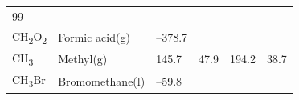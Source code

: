 \documentclass[
  9pt,
]{extbook}
\theoremstyle{definition}
\theoremstyle{definition}
\theoremstyle{definition}
\theoremstyle{remark}
\begin{document}
\begin{longtable}[]{@{}llllll@{}}
\begin{minipage}[t]{0.14\columnwidth}
99\strut
\end{minipage}\tabularnewline
\begin{minipage}[t]{0.07\columnwidth}\raggedright
CH\textsubscript{2}O\textsubscript{2}\strut
\end{minipage} & \begin{minipage}[t]{0.17\columnwidth}\raggedright
Formic acid(g)\strut
\end{minipage} & \begin{minipage}[t]{0.15\columnwidth}\raggedright
--378.7\strut
\end{minipage} & \begin{minipage}[t]{0.15\columnwidth}\raggedright
\strut
\end{minipage} & \begin{minipage}[t]{0.14\columnwidth}\raggedright
\strut
\end{minipage} & \begin{minipage}[t]{0.14\columnwidth}\raggedright
\strut
\end{minipage}\tabularnewline
\begin{minipage}[t]{0.07\columnwidth}\raggedright
CH\textsubscript{3}\strut
\end{minipage} & \begin{minipage}[t]{0.17\columnwidth}\raggedright
Methyl(g)\strut
\end{minipage} & \begin{minipage}[t]{0.15\columnwidth}\raggedright
145.7\strut
\end{minipage} & \begin{minipage}[t]{0.15\columnwidth}\raggedright
47.9\strut
\end{minipage} & \begin{minipage}[t]{0.14\columnwidth}\raggedright
194.2\strut
\end{minipage} & \begin{minipage}[t]{0.14\columnwidth}\raggedright
38.7\strut
\end{minipage}\tabularnewline
\begin{minipage}[t]{0.07\columnwidth}\raggedright
CH\textsubscript{3}Br\strut
\end{minipage} & \begin{minipage}[t]{0.17\columnwidth}\raggedright
Bromomethane(l)\strut
\end{minipage} & \begin{minipage}[t]{0.15\columnwidth}\raggedright
--59.8\strut
\end{minipage} & \begin{minipage}[t]{0.15\columnwidth}\raggedright

\end{minipage}
\end{longtable}
\end{document}
